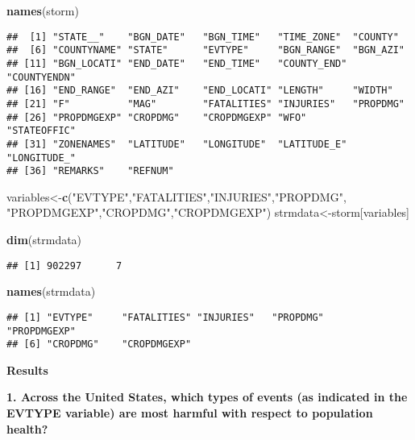 \documentclass[
]{article}
\newenvironment{Shaded}{\begin{snugshade}}{\end{snugshade}}
\newcommand{\KeywordTok}[1]{\textcolor[rgb]{0.13,0.29,0.53}{\textbf{#1}}}
\newcommand{\NormalTok}[1]{#1}
\newcommand{\StringTok}[1]{\textcolor[rgb]{0.31,0.60,0.02}{#1}}
\begin{document}
\begin{Shaded}
\begin{Highlighting}[]
\KeywordTok{names}\NormalTok{(storm)}
\end{Highlighting}
\end{Shaded}

\begin{verbatim}
##  [1] "STATE__"    "BGN_DATE"   "BGN_TIME"   "TIME_ZONE"  "COUNTY"    
##  [6] "COUNTYNAME" "STATE"      "EVTYPE"     "BGN_RANGE"  "BGN_AZI"   
## [11] "BGN_LOCATI" "END_DATE"   "END_TIME"   "COUNTY_END" "COUNTYENDN"
## [16] "END_RANGE"  "END_AZI"    "END_LOCATI" "LENGTH"     "WIDTH"     
## [21] "F"          "MAG"        "FATALITIES" "INJURIES"   "PROPDMG"   
## [26] "PROPDMGEXP" "CROPDMG"    "CROPDMGEXP" "WFO"        "STATEOFFIC"
## [31] "ZONENAMES"  "LATITUDE"   "LONGITUDE"  "LATITUDE_E" "LONGITUDE_"
## [36] "REMARKS"    "REFNUM"
\end{verbatim}

\begin{Shaded}
\begin{Highlighting}[]
\NormalTok{variables<-}\KeywordTok{c}\NormalTok{(}\StringTok{"EVTYPE"}\NormalTok{,}\StringTok{"FATALITIES"}\NormalTok{,}\StringTok{"INJURIES"}\NormalTok{,}\StringTok{"PROPDMG"}\NormalTok{, }\StringTok{"PROPDMGEXP"}\NormalTok{,}\StringTok{"CROPDMG"}\NormalTok{,}\StringTok{"CROPDMGEXP"}\NormalTok{)}
\NormalTok{strmdata<-storm[variables]}

\KeywordTok{dim}\NormalTok{(strmdata)}
\end{Highlighting}
\end{Shaded}

\begin{verbatim}
## [1] 902297      7
\end{verbatim}

\begin{Shaded}
\begin{Highlighting}[]
\KeywordTok{names}\NormalTok{(strmdata)}
\end{Highlighting}
\end{Shaded}

\begin{verbatim}
## [1] "EVTYPE"     "FATALITIES" "INJURIES"   "PROPDMG"    "PROPDMGEXP"
## [6] "CROPDMG"    "CROPDMGEXP"
\end{verbatim}

\textbf{Results}

\textbf{1. Across the United States, which types of events (as indicated
in the \color{red}{\verb|EVTYPE|}EVTYPE variable) are most harmful with
respect to population health?}
\end{document}
